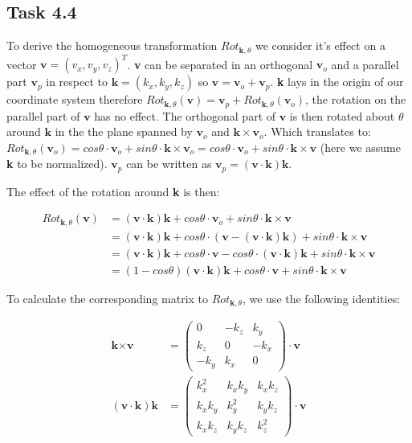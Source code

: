 \subsection*{Task 4.4}

To derive the homogeneous transformation $Rot_{\textbf{k},\theta}$ we consider it's effect on a vector $\textbf{v}=(v_x,v_y,v_z)^T$.
\textbf{v} can be separated in an orthogonal $\textbf{v}_o$ and a parallel part $\textbf{v}_p$ in respect to $\textbf{k}=(k_x,k_y,k_z)$ so $\textbf{v} = \textbf{v}_o+\textbf{v}_p$.
\textbf{k} lays in the origin of our coordinate system therefore $Rot_{\textbf{k},\theta}(\textbf{v}) = \textbf{v}_p+Rot_{\textbf{k},\theta}(\textbf{v}_o)$, the rotation on the parallel part of $\textbf{v}$ has no effect.
The orthogonal part of $\textbf{v}$ is then rotated about $\theta$ around $\textbf{k}$ in the the plane spanned by $\textbf{v}_o$ and $\textbf{k}\times\textbf{v}_o$.
Which translates to: $Rot_{\textbf{k},\theta}(\textbf{v}_o) = cos\theta\cdot\textbf{v}_o+sin\theta\cdot\textbf{k}\times\textbf{v}_o= cos\theta\cdot\textbf{v}_o+sin\theta\cdot\textbf{k}\times\textbf{v}$ (here we assume \textbf{k} to be normalized). $\textbf{v}_p$ can be written as $\textbf{v}_p = (\textbf{v}\cdot\textbf{k})\textbf{k}$.

The effect of the rotation around \textbf{k} is then: 

\begin{align*}
Rot_{\textbf{k},\theta}(\textbf{v}) &= (\textbf{v}\cdot\textbf{k})\textbf{k}+cos\theta\cdot\textbf{v}_o+sin\theta\cdot\textbf{k}\times\textbf{v}\\
&= (\textbf{v}\cdot\textbf{k})\textbf{k}+cos\theta\cdot(\textbf{v}-(\textbf{v}\cdot\textbf{k})\textbf{k})+sin\theta\cdot\textbf{k}\times\textbf{v}\\
&= (\textbf{v}\cdot\textbf{k})\textbf{k}+cos\theta\cdot\textbf{v}-cos\theta\cdot(\textbf{v}\cdot\textbf{k})\textbf{k}+sin\theta\cdot\textbf{k}\times\textbf{v}\\
&= (1-cos\theta)(\textbf{v}\cdot\textbf{k})\textbf{k}+cos\theta\cdot\textbf{v}+sin\theta\cdot\textbf{k}\times\textbf{v}
\end{align*}

To calculate the corresponding matrix to $Rot_{\textbf{k},\theta}$, we use the following identities:

\begin{align*}
\textbf{k}\times\textbf{v} &= 
	\begin{pmatrix}
	0 & -k_z & k_y\\
	k_z & 0 & -k_x\\
	-k_y & k_x & 0
	\end{pmatrix}\cdot \textbf{v} \\
(\textbf{v}\cdot\textbf{k})\textbf{k} &= 
\begin{pmatrix}
k_x^2 & k_xk_y & k_xk_z \\
k_xk_y & k_y^2 & k_yk_z \\
k_xk_z & k_yk_z & k_z^2
\end{pmatrix}\cdot \textbf{v}
\end{align*}

